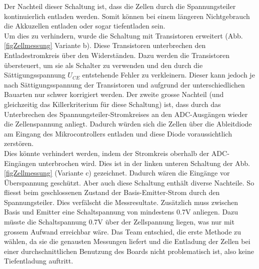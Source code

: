 Der Nachteil dieser Schaltung ist, dass die Zellen durch die Spannungsteiler kontinuierlich entladen werden. Somit können bei einem längeren Nichtgebrauch die Akkuzellen entladen oder sogar tiefentladen sein. \\
Um dies zu verhindern, wurde die Schaltung mit Transistoren erweitert (Abb.\ref{figZellmessung} Variante b). Diese Transistoren unterbrechen den Entladestromkreis über den Widerständen. Dazu werden die Transistoren übersteuert, um sie als Schalter zu verwenden und den durch die Sättigungsspannung $U_{CE}$ entstehende Fehler zu verkleinern. Dieser kann jedoch je nach Sättigungsspannung der Transistoren und aufgrund der unterschiedlichen Bauarten nur schwer korrigiert werden. Der zweite grosse Nachteil (und gleichzeitig das Killerkriterium für diese Schaltung) ist, dass durch das Unterbrechen des Spannungsteiler-Stromkreises an den ADC-Ausgängen wieder die Zellenspannung anliegt. Dadurch würden sich die Zellen über die Ableitdiode am Eingang des Mikrocontrollers entladen und diese Diode voraussichtlich zerstören. \\
Dies könnte verhindert werden, indem der Stromkreis oberhalb der ADC-Eingängen unterbrochen wird. Dies ist in der linken unteren Schaltung der Abb.\ref{figZellmessung} (Variante c) gezeichnet. Dadurch wären die Eingänge vor Überspannung geschützt. Aber auch diese Schaltung enthält diverse Nachteile. So fliesst beim geschlossenen Zustand der Basis-Emitter-Strom durch den Spannungsteiler. Dies verfälscht die Messresultate. Zusätzlich muss zwischen Basis und Emitter eine Schaltspannung von mindestens 0.7V anliegen. Dazu müsste die Schaltspannung 0.7V über der Zellspannung liegen, was nur mit grossem Aufwand erreichbar wäre. 
Das Team entschied, die erste Methode zu wählen, da sie die genausten Messungen liefert und die Entladung der Zellen bei einer durchschnittlichen Benutzung des Boards nicht problematisch ist, also keine Tiefentladung auftritt.

